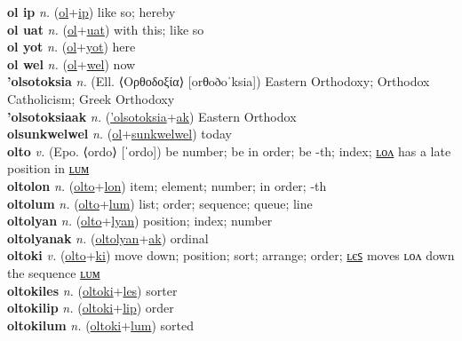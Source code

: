 \textbf{ol ip} \textit{n.} (\hyperref[ol]{ol}+\hyperref[p]{ip})
like so; hereby \label{ol ip} \\
\textbf{ol uat} \textit{n.} (\hyperref[ol]{ol}+\hyperref[at]{uat})
with this; like so \label{ol uat} \\
\textbf{ol yot} \textit{n.} (\hyperref[ol]{ol}+\hyperref[ot]{yot})
here \label{ol yot} \\
\textbf{ol wel} \textit{n.} (\hyperref[ol]{ol}+\hyperref[el]{wel})
now \label{ol wel} \\
\textbf{'olsotoksia} \textit{n.} (Ell. ⟨Ορθοδοξία⟩ [orθoðoˈksia])
Eastern Orthodoxy; Orthodox Catholicism; Greek Orthodoxy \label{'olsotoksia} \\
\textbf{'olsotoksiaak} \textit{n.} (\hyperref['olsotoksia]{'olsotoksia}+\hyperref[ak]{ak})
Eastern Orthodox \label{'olsotoksiaak} \\
\textbf{olsunkwelwel} \textit{n.} (\hyperref[ol]{ol}+\hyperref[sunkwelwel]{sunkwelwel})
today \label{olsunkwelwel} \\
\textbf{olto} \textit{v.} (Epo. ⟨ordo⟩ [ˈordo])
be number; be in order; be -th; index; \hyperref[oltolon]{ʟᴏᴧ} has a late position in \hyperref[oltolum]{ʟᴜᴍ} \label{olto} \\
\textbf{oltolon} \textit{n.} (\hyperref[olto]{olto}+\hyperref[lon]{lon})
item; element; number; in order; -th \label{oltolon} \\
\textbf{oltolum} \textit{n.} (\hyperref[olto]{olto}+\hyperref[lum]{lum})
list; order; sequence; queue; line \label{oltolum} \\
\textbf{oltolyan} \textit{n.} (\hyperref[olto]{olto}+\hyperref[lyan]{lyan})
position; index; number \label{oltolyan} \\
\textbf{oltolyanak} \textit{n.} (\hyperref[oltolyan]{oltolyan}+\hyperref[ak]{ak})
ordinal \label{oltolyanak} \\
\textbf{oltoki} \textit{v.} (\hyperref[olto]{olto}+\hyperref[ki]{ki})
move down; position; sort; arrange; order; \hyperref[oltokiles]{ʟєꜱ} moves ʟᴏᴧ down the sequence \hyperref[oltokilum]{ʟᴜᴍ} \label{oltoki} \\
\textbf{oltokiles} \textit{n.} (\hyperref[oltoki]{oltoki}+\hyperref[les]{les})
sorter \label{oltokiles} \\
\textbf{oltokilip} \textit{n.} (\hyperref[oltoki]{oltoki}+\hyperref[lip]{lip})
order \label{oltokilip} \\
\textbf{oltokilum} \textit{n.} (\hyperref[oltoki]{oltoki}+\hyperref[lum]{lum})
sorted \label{oltokilum} \\

